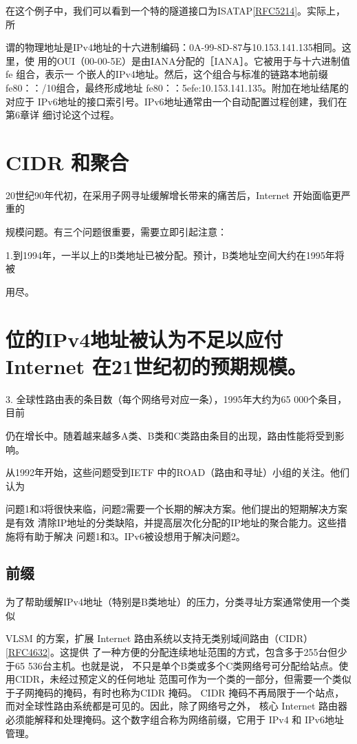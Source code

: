 在这个例子中，我们可以看到一个特的隧道接口为ISATAP\href{https://www.rfc-editor.org/rfc/rfc5214}{[RFC5214]}。实际上，所

谓的物理地址是IPv4地址的十六进制编码：0A-99-8D-87与10.153.141.135相同。这里，使
用的OUI（00-00-5E）是由IANA分配的［IANA］。它被用于与十六进制值 fe 组合，表示一
个嵌人的IPv4地址。然后，这个组合与标准的链路本地前缀fe80：：/10组合，最终形成地址
fe80：：5efe:10.153.141.135。附加在地址结尾的%
对应于 IPv6地址的接口索引号。IPv6地址通常由一个自动配置过程创建，我们在第6章详
细讨论这个过程。

\section{CIDR 和聚合}
20世纪90年代初，在采用子网寻址缓解增长带来的痛苦后，Internet 开始面临更严重的

规模问题。有三个问题很重要，需要立即引起注意：

1.到1994年，一半以上的B类地址已被分配。预计，B类地址空间大约在1995年将被

用尽。

\section{位的IPv4地址被认为不足以应付 Internet 在21世纪初的预期规模。}
3. 全球性路由表的条目数（每个网络号对应一条），1995年大约为65 000个条目，目前

仍在增长中。随着越来越多A类、B类和C类路由条目的出现，路由性能将受到影响。

从1992年开始，这些问题受到IETF 中的ROAD（路由和寻址）小组的关注。他们认为

问题1和3将很快来临，问题2需要一个长期的解决方案。他们提出的短期解决方案是有效
清除IP地址的分类缺陷，并提高层次化分配的IP地址的聚合能力。这些措施将有助于解决
问题1和3。IPv6被设想用于解决问题2。

\subsection{前缀}
为了帮助缓解IPv4地址（特别是B类地址）的压力，分类寻址方案通常使用一个类似

VLSM 的方案，扩展 Internet 路由系统以支持无类别域间路由（CIDR）\href{https://www.rfc-editor.org/rfc/rfc4632}{[RFC4632]}。这提供
了一种方便的分配连续地址范围的方式，包含多于255台但少于65 536台主机。也就是说，
不只是单个B类或多个C类网络号可分配给站点。使用CIDR，未经过预定义的任何地址
范围可作为一个类的一部分，但需要一个类似于子网掩码的掩码，有时也称为CIDR 掩码。
CIDR 掩码不再局限于一个站点，而对全球性路由系统都是可见的。因此，除了网络号之外，
核心 Internet 路由器必须能解释和处理掩码。这个数字组合称为网络前缀，它用于 IPv4 和
IPv6地址管理。

